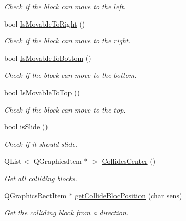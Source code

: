 \begin{DoxyCompactItemize}
\begin{DoxyCompactList}\small\item\em Check if the block can move to the left. \end{DoxyCompactList}\item 
bool \hyperlink{class_b___movable_a134b648413c6d27c008f8a0655ffa0f9}{Is\+Movable\+To\+Right} ()
\begin{DoxyCompactList}\small\item\em Check if the block can move to the right. \end{DoxyCompactList}\item 
bool \hyperlink{class_b___movable_a190fdc076141ae6698334bfe4dfd61a3}{Is\+Movable\+To\+Bottom} ()
\begin{DoxyCompactList}\small\item\em Check if the block can move to the bottom. \end{DoxyCompactList}\item 
bool \hyperlink{class_b___movable_a68bb6a98d031f9495cdeb80b9aa325c4}{Is\+Movable\+To\+Top} ()
\begin{DoxyCompactList}\small\item\em Check if the block can move to the top. \end{DoxyCompactList}\item 
bool \hyperlink{class_b___movable_a44d1413ec8bceda3b1a50c673b429d03}{is\+Slide} ()
\begin{DoxyCompactList}\small\item\em Check if it should slide. \end{DoxyCompactList}\item 
Q\+List$<$ Q\+Graphics\+Item $\ast$ $>$ \hyperlink{class_b___movable_a081e4e71fb9483330f3315e6b32bbcbb}{Collides\+Center} ()
\begin{DoxyCompactList}\small\item\em Get all colliding blocks. \end{DoxyCompactList}\item 
Q\+Graphics\+Rect\+Item $\ast$ \hyperlink{class_b___movable_a4cb26e3d494505eaaa6773c0a448c479}{get\+Collide\+Bloc\+Position} (char sens)
\begin{DoxyCompactList}\small\item\em Get the colliding block from a direction. \end{DoxyCompactList}\end{DoxyCompactItemize}

